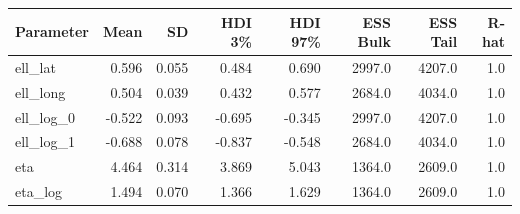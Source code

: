 \begin{table}[htbp]
\centering
{}
\label{tab:hsgp_event_results}
\small
\begin{tabular}{lrrrrrrr}
\toprule
\textbf{Parameter} & \textbf{Mean} & \textbf{SD} & \textbf{HDI 3\%} & \textbf{HDI 97\%} & \textbf{ESS Bulk} & \textbf{ESS Tail} & \textbf{R-hat} \\
\midrule
ell\_lat & 0.596 & 0.055 & 0.484 & 0.690 & 2997.0 & 4207.0 & 1.0 \\
ell\_long & 0.504 & 0.039 & 0.432 & 0.577 & 2684.0 & 4034.0 & 1.0 \\
ell\_log\_0 & -0.522 & 0.093 & -0.695 & -0.345 & 2997.0 & 4207.0 & 1.0 \\
ell\_log\_1 & -0.688 & 0.078 & -0.837 & -0.548 & 2684.0 & 4034.0 & 1.0 \\
eta & 4.464 & 0.314 & 3.869 & 5.043 & 1364.0 & 2609.0 & 1.0 \\
eta\_log & 1.494 & 0.070 & 1.366 & 1.629 & 1364.0 & 2609.0 & 1.0 \\
\bottomrule
\end{tabular}
\end{table}
